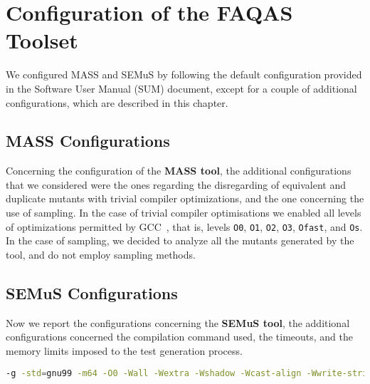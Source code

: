 
\chapter{Configuration of the FAQAS Toolset}




We configured MASS and SEMuS by following the default configuration provided in the Software User Manual (SUM) document, except for a couple of additional configurations, which are described in this chapter.

\section{MASS Configurations}


Concerning the configuration of the \textbf{MASS tool}, the additional configurations that we considered were the ones regarding the disregarding of equivalent and duplicate mutants with trivial compiler optimizations, and the one concerning the use of sampling.
In the case of trivial compiler optimisations we enabled all levels of optimizations permitted by GCC~\cite{GCCopt}, that is, levels \texttt{O0}, \texttt{O1}, \texttt{O2}, \texttt{O3}, \texttt{Ofast}, and \texttt{Os}. 
In the case of sampling, we decided to analyze all the mutants generated by the tool, and do not employ sampling methods. 

\section{SEMuS Configurations}

Now we report the configurations concerning the \textbf{SEMuS tool}, the additional configurations concerned the compilation command used, the timeouts, and the memory limits imposed to the test generation process.

\begin{lstlisting}[language=bash, label=libutil_com_cmd, caption=Compilation command for a single Libutil source used in SEMuS.]
-g -std=gnu99 -m64 -O0 -Wall -Wextra -Wshadow -Wcast-align -Wwrite-strings -Wno-unused-parameter -I$repo_root_dir/src -I$repo_root_dir/src/gosh -I$repo_root_dir/src/zip -I$repo_root_dir/src/watchdog  -I$repo_root_dir/build/src/watchdog -I$repo_root_dir/build/src -I$repo_root_dir/include -I$repo_root_dir/build/include -I$repo_root_dir/include/gs -I$repo_root_dir/build/include/gs -I$repo_root_dir/include/deprecated -I$repo_root_dir/build/include/deprecated -I$repo_root_dir/include/deprecated/gs/gosh -I$repo_root_dir/build/include/deprecated/gs/gosh -I$repo_root_dir/include -o $out_file $in_file
\end{lstlisting}

